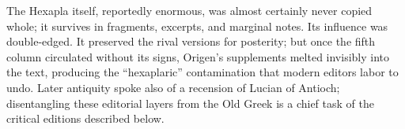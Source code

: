 The Hexapla itself, reportedly enormous, was almost certainly never copied
whole; it survives in fragments, excerpts, and marginal notes. Its
influence was double-edged. It preserved the rival versions for posterity;
but once the fifth column circulated without its signs, Origen's
supplements melted invisibly into the text, producing the ``hexaplaric''
contamination that modern editors labor to undo. Later antiquity spoke
also of a recension of Lucian of Antioch; disentangling these editorial
layers from the Old Greek is a chief task of the critical editions
described below.
